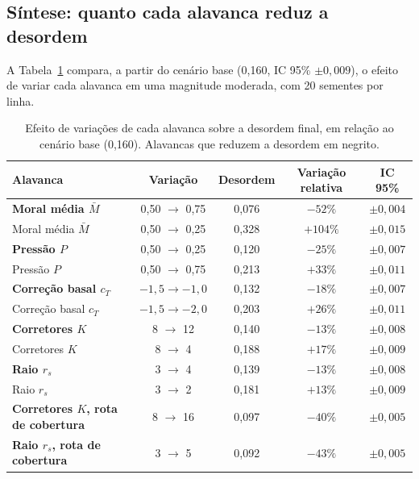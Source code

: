 \documentclass[11pt, a4paper]{article}
\begin{document}
\subsection{Síntese: quanto cada alavanca reduz a desordem}
A Tabela~\ref{tab:alavancas} compara, a partir do cenário base (0,160, IC 95\% $\pm0{,}009$), o efeito de variar cada alavanca em uma magnitude moderada, com 20 sementes por linha.

\begin{table}[t]
\centering
\footnotesize
\caption{Efeito de variações de cada alavanca sobre a desordem final, em relação ao cenário base (0,160). Alavancas que reduzem a desordem em negrito.}
\label{tab:alavancas}
\begin{tabular}{@{}lcccc@{}}
\toprule
Alavanca & Variação & Desordem & Variação relativa & IC 95\% \\
\midrule
\textbf{Moral média $\bar M$} & 0,50 $\to$ 0,75 & 0,076 & $-52\%$ & $\pm0{,}004$ \\
Moral média $\bar M$ & 0,50 $\to$ 0,25 & 0,328 & $+104\%$ & $\pm0{,}015$ \\
\textbf{Pressão $P$} & 0,50 $\to$ 0,25 & 0,120 & $-25\%$ & $\pm0{,}007$ \\
Pressão $P$ & 0,50 $\to$ 0,75 & 0,213 & $+33\%$ & $\pm0{,}011$ \\
\textbf{Correção basal $c_T$} & $-1{,}5\to-1{,}0$ & 0,132 & $-18\%$ & $\pm0{,}007$ \\
Correção basal $c_T$ & $-1{,}5\to-2{,}0$ & 0,203 & $+26\%$ & $\pm0{,}011$ \\
\textbf{Corretores $K$} & 8 $\to$ 12 & 0,140 & $-13\%$ & $\pm0{,}008$ \\
Corretores $K$ & 8 $\to$ 4 & 0,188 & $+17\%$ & $\pm0{,}009$ \\
\textbf{Raio $r_s$} & 3 $\to$ 4 & 0,139 & $-13\%$ & $\pm0{,}008$ \\
Raio $r_s$ & 3 $\to$ 2 & 0,181 & $+13\%$ & $\pm0{,}009$ \\
\textbf{Corretores $K$, rota de cobertura} & 8 $\to$ 16 & 0,097 & $-40\%$ & $\pm0{,}005$ \\
\textbf{Raio $r_s$, rota de cobertura} & 3 $\to$ 5 & 0,092 & $-43\%$ & $\pm0{,}005$ \\
\bottomrule
\end{tabular}
\end{table}

\end{document}
